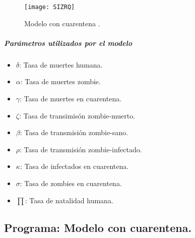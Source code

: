 \documentclass[12pt]{article}
\begin{document}
\begin{figure}[H]
\centering
 \texttt{[image: SIZRQ]}
 \caption{Modelo con cuarentena \cite{Z}.}
 \label{SIZRQ}
\end{figure}

\subparagraph*{Parámetros utilizados por el modelo}
\begin{itemize}
\item $\delta$: Tasa de muertes humana.
\item $\alpha$: Tasa de muertes zombie.
\item $\gamma$: Tasa de muertes en cuarentena.
\item $\zeta$: Tasa de transimisón zombie-muerto.
\item $\beta$: Tasa de transmisión zombie-sano.
\item $\rho$: Tasa de transmisión zombie-infectado.
\item $\kappa$: Tasa de infectados en cuarentena.
\item $\sigma$: Tasa de zombies en cuarentena.
\item $\prod$: Tasa de natalidad humana.
\end{itemize}

\subsection*{Programa: Modelo con cuarentena.}
\end{document}
